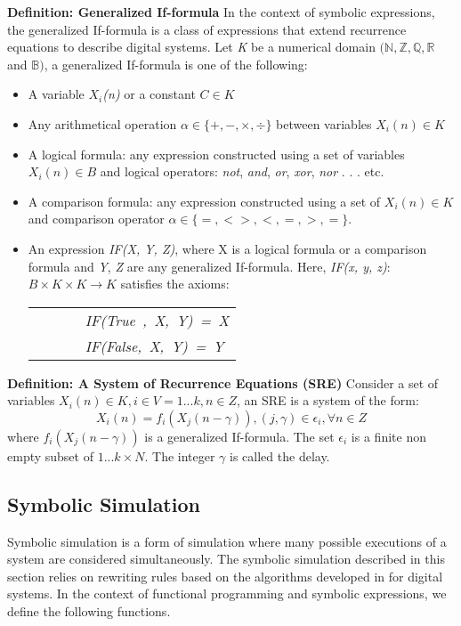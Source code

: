 \documentclass[submission,copyright,creativecommons]{eptcs}
\begin{document}
\noindent \textbf{Definition: Generalized If-formula}
In the context of symbolic expressions, the generalized If-formula is a class of expressions that extend recurrence equations to describe digital systems. Let \emph{K} be a numerical domain $(\mathbb{N}, \mathbb{Z}, \mathbb{Q}, \mathbb{R}$ and $\mathbb{B})$, a generalized If-formula is one of the following: \begin{itemize}
  \item A variable \( X_{i}\)\emph{(n)} or a constant \(C \in K \)
  \item Any arithmetical operation \(\alpha \in \{+,-,\times,\div\}\) between variables \(X_{i}(n) \in K\)
  \item A logical formula: any expression constructed using a set of variables \(X_{i}(n) \in B\) and logical operators: \emph{not}, \emph{and}, \emph{or}, \emph{xor}, \emph{nor} . . . etc.
  \item A comparison formula: any expression constructed using a set of \(X_{i}(n) \in K\) and comparison operator \(\alpha \in \{=, <>, <, =, >, =\}\).
  \item An expression \emph{IF(X, Y, Z)}, where X is a logical formula or a comparison formula and \emph{Y}, \emph{Z} are any generalized If-formula. Here, \emph{IF(x, y, z)}: \( B \times K \times K \rightarrow K \) satisfies the axioms:

\begin{tabular}{ll}
~~~~~ & \emph{IF(True~,~X,~Y)~=~X} \\
~~~~~ & \emph{IF(False,~X,~Y)~=~Y} \\
\end{tabular}
\end{itemize}
\noindent \textbf{Definition: A System of Recurrence Equations (SRE)}
Consider a set of variables \( X_{i}(n) \in K, i \in V = 1 . . . k, n \in Z \), an SRE is a system of the form: \[ X_{i}(n) = f_{i}(X_{j}(n - \gamma)), ( j, \gamma) \in \epsilon_{i}, \forall n \in Z \] where \( f_{i}(X_{j}(n - \gamma)) \) is a generalized If-formula. The set \( \epsilon_{i} \) is a finite non empty subset of \( 1 . . . k \times N \). The integer \( \gamma \) is called the delay.

\subsection{Symbolic Simulation}

Symbolic simulation is a form of simulation where many possible executions of a system are considered simultaneously. The symbolic simulation described in this section relies on rewriting rules based on the algorithms developed in \cite{1} for digital systems. In the context of functional programming and symbolic expressions, we define the following functions.\\
\end{document}

